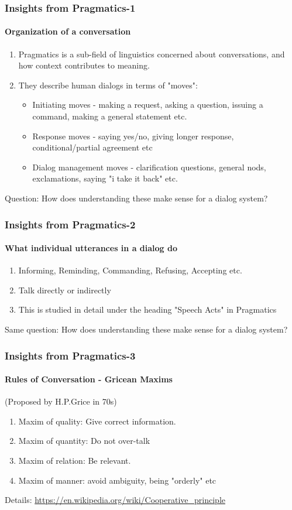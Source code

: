 \documentclass{beamer}
\begin{document}
\begin{frame}
\frametitle{Insights from Pragmatics-1}
\framesubtitle{Organization of a conversation}
\begin{enumerate}
\item Pragmatics is a sub-field of linguistics concerned about conversations, and how context contributes to meaning.
\item They describe human dialogs in terms of "moves":
\begin{itemize}
\item Initiating moves - making a request, asking a question, issuing a command, making a general statement etc.
\item Response moves - saying yes/no, giving longer response, conditional/partial agreement etc
\item Dialog management moves - clarification questions, general nods, exclamations, saying "i take it back" etc.
\end{itemize}
\end{enumerate}
Question: How does understanding these make sense for a dialog system? 
\end{frame}

\begin{frame}
\frametitle{Insights from Pragmatics-2}
\framesubtitle{What individual utterances in a dialog do}
\begin{enumerate}
\item Informing, Reminding, Commanding, Refusing, Accepting etc.
\item Talk directly or indirectly
\item This is studied in detail under the heading "Speech Acts" in Pragmatics
\end{enumerate}
Same question: How does understanding these make sense for a dialog system? 
\end{frame}

\begin{frame}
\frametitle{Insights from Pragmatics-3}
\framesubtitle{Rules of Conversation - Gricean Maxims}
(Proposed by H.P.Grice in 70s)
\begin{enumerate}
\item Maxim of quality:  Give correct information.
\item Maxim of quantity: Do not over-talk
\item Maxim of relation: Be relevant.
\item Maxim of manner: avoid ambiguity, being "orderly" etc
\end{enumerate}
Details: \url{https://en.wikipedia.org/wiki/Cooperative_principle}
\end{frame}
\end{document}

